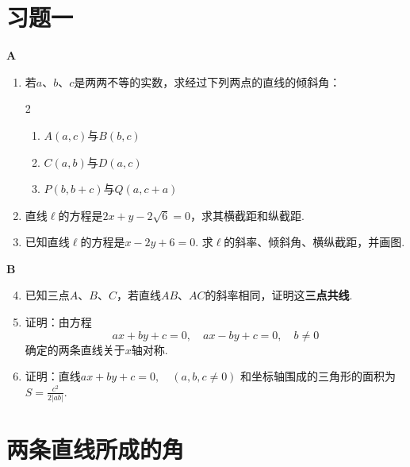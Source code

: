 \section*{习题一}
\begin{center}
    \bfseries A
\end{center}

\begin{enumerate}
    \item 若$a$、$b$、$c$是两两不等的实数，求经过下列两点的直线的倾斜角：
\begin{multicols}{2}
\begin{enumerate}[(1)]
\item $A(a,c)$与$B(b,c)$
\item $C(a,b)$与$D(a,c)$
\item $P(b,b+c)$与$Q(a,c+a)$
\end{enumerate}
\end{multicols}

    \item 直线$\ell$的方程是$2x+y-2\sqrt{6}=0$，求其横截距和纵截距.
    \item 已知直线$\ell$的方程是$x-2y+6=0$. 求$\ell$的斜率、倾斜角、横纵截距，并画图.
\end{enumerate}

\begin{center}
    \bfseries B
\end{center}

\begin{enumerate}\setcounter{enumi}{3}
    \item 已知三点$A$、$B$、$C$，若直线$AB$、$AC$的斜率相同，证明这\textbf{三点共线}.
\item     证明：由方程
    \[ax+by+c=0, \quad ax-by+c=0,\quad b\ne 0\]
    确定的两条直线关于$x$轴对称.
\item 证明：直线$ax+by+c=0,\quad (a,b,c\ne 0)$
    和坐标轴围成的三角形的面积为$S=\frac{c^2}{2|ab|}$.
\end{enumerate}

\section{两条直线所成的角}


